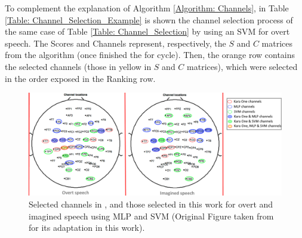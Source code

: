 To complement the explanation of Algorithm  \ref{Algorithm: Channels}, in Table \ref{Table: Channel_Selection_Example} is shown the channel selection process of the same case of Table \ref{Table: Channel_Selection} by using an SVM for overt speech. The Scores and Channels represent, respectively, the $S$ and $C$ matrices from the algorithm (once finished the for cycle). Then, the orange row contains the selected channels (those in yellow in $S$ and $C$ matrices), which were selected in the order exposed in the Ranking row.\\

\begin{figure}[h!]
	\centering
	\includegraphics[width=\linewidth]{Figures/Channel_Selection.png}
	\caption{Selected channels in \cite{zhao2015classifying,zhao2013combining}, and those selected in this work for overt and imagined speech using MLP and SVM (Original Figure taken from \cite{karaone} for its adaptation in this work).}
	\label{Fig: Channel_Selection}
\end{figure}


